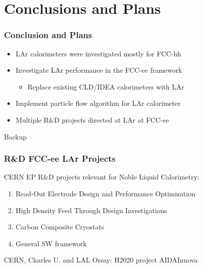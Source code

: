 \documentclass[aspectratio=169]{beamer}
\newcommand{\backupbegin}{%
   \newcounter{finalframe}
   \setcounter{finalframe}{\value{framenumber}}
}
\newcommand{\redtext}[1]{%
  \textcolor{myRed}{#1}
}
\begin{document}
%
%
\section{Conclusions and Plans}

\begin{frame}
  \frametitle{Conclusion and Plans}

  \begin{itemize}
    \item LAr calorimeters were investigated mostly for FCC-hh
    \item Investigate LAr performance in the FCC-ee framework
          \begin{itemize}
            \item Replace existing CLD/IDEA calorimeters with LAr
          \end{itemize}
    \item Implement particle flow algorithm for LAr calorimeter
    \item Multiple R\&D projects directed at LAr at FCC-ee
  \end{itemize}
\end{frame}

%
%
\appendix
\backupbegin{}

\begin{frame}[c]
  \begin{center}
    \redtext{\Huge Backup}
  \end{center}
\end{frame}


\begin{frame}
  \frametitle{R\&D FCC-ee LAr Projects}

  CERN EP R\&D projects relevant for Noble Liquid Calorimetry:

  \begin{enumerate}
    \item Read-Out Electrode Design and Performance Optimization
    \item High Density Feed Through Design Investigations
    \item Carbon Composite Cryostats
    \item General SW framework
  \end{enumerate}

  CERN, Charles U. and LAL Orsay: H2020 project AIDAInnova

\end{frame}
\end{document}
